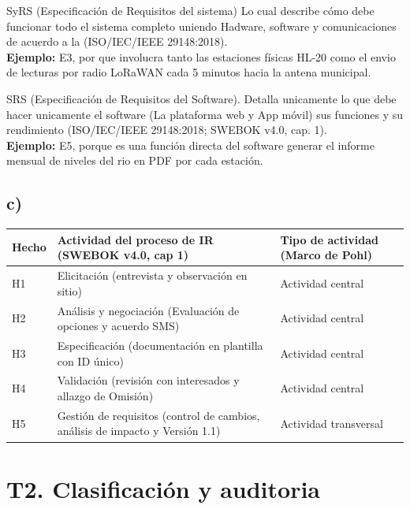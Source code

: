 \documentclass[11pt,a4paper]{article}
\begin{document}
	\vspace{0.2cm}
	\noindent
	SyRS (Especificación de Requisitos del sistema) Lo cual describe cómo debe funcionar todo el sistema completo uniendo Hadware, software y comunicaciones de acuerdo a la (ISO/IEC/IEEE 29148:2018). \\
	\textbf{Ejemplo:} E3, por que involucra tanto las estaciones físicas HL-20 como el envio de lecturas por radio LoRaWAN cada 5 minutos hacia la antena municipal.
	
	\vspace{0.2cm}
	\noindent
	SRS (Especificación de Requisitos del Software). Detalla unicamente lo que debe hacer unicamente el software (La plataforma web y App móvil) sus funciones y su rendimiento (ISO/IEC/IEEE 29148:2018; SWEBOK v4.0, cap. 1). \\
	\textbf{Ejemplo:} E5, porque es una función directa del software generar el informe mensual de niveles del rio en PDF por cada estación.
	
	\subsection*{c)}
	
	\begin{center}
		\begin{tabularx}{\textwidth}{|l|X|l|}
			\hline
			\textbf{Hecho} & \textbf{Actividad del proceso de IR (SWEBOK v4.0, cap 1)} & \textbf{Tipo de actividad (Marco de Pohl)} \\
			\hline
			H1 & Elicitación (entrevista y observación en sitio) & Actividad central \\
			\hline
			H2 & Análisis y negociación (Evaluación de opciones y acuerdo SMS) & Actividad central \\
			\hline
			H3 & Especificación (documentación en plantilla con ID único) & Actividad central \\
			\hline
			H4 & Validación (revisión con interesados y allazgo de Omisión) & Actividad central \\
			\hline
			H5 & Gestión de requisitos (control de cambios, análisis de impacto y Versión 1.1) & Actividad transversal \\
			\hline
		\end{tabularx}
	\end{center}
	
	\section*{T2. Clasificación y auditoria}
	
\end{document}
